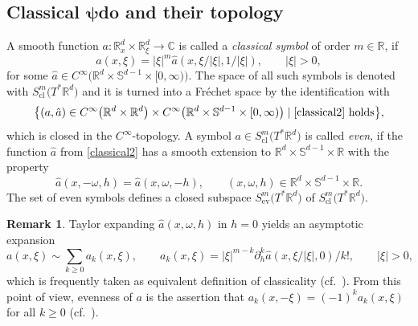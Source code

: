 \documentclass[10pt,a4paper]{amsart}
\numberwithin{equation}{section}
\theoremstyle{definition}
\newtheorem{Remark}[Theorem]{Remark}
\newcommand{\R}{\mathbb{R}} %
\newcommand{\C}{\mathbb{C}} %
\newcommand{\ev}{\mathrm{ev}}
\newcommand{\1}{{\bf 1}}
\newcommand{\cl}{\mathrm{cl}}
\begin{document}
\subsection[Classical psido and their topology]{Classical $\boldsymbol{\psi}$do and their topology}
A smooth function $a\colon \R^d_x\times \R^d_\xi\rightarrow \C$ is called a {\it classical symbol} of order $m\in \R$, if
\begin{equation}\label{classical2}
	a(x,\xi)=|\xi|^m \hat a(x,\xi/|\xi|,1/|\xi|),\qquad |\xi|>0,
\end{equation}
for some $\hat a \in C^\infty\bigl(\R^d\times \mathbb S^{d-1}\times [0,\infty)\bigr)$. The space of all such symbols is denoted with $S_\cl^m\bigl(T^*\R^d\bigr)$ and it is turned into a Fr{\'e}chet space by the identification with
\[
	\big\{(a,\hat a)\in C^\infty\bigl(\R^d\times \R^d\bigr)\times C^\infty\bigl(\R^d\times \mathbb S^{d-1}\times [0,\infty)\bigr)\mid \text{\eqref{classical2} holds}\big\},
\]
which is closed in the $C^\infty$-topology. A symbol $a\in S^m_\cl\bigl(T^*\R^d\bigr)$ is called {\it even}, if the function $\hat a$ from \eqref{classical2} has a smooth extension to $\R^d\times \mathbb S^{d-1}\times \R$ with the property
\[
	\hat a(x,-\omega,h)= \hat a(x,\omega,-h),\qquad (x,\omega,h)\in \R^d\times \mathbb S^{d-1}\times \R.
\]
The set of even symbols defines a closed subspace $S^m_\ev\bigl(T^*\R^d\bigr)$ of $S^m_\cl\bigl(T^*\R^d\bigr)$.

\begin{Remark} Taylor expanding $\hat a(x,\omega,h)$ in $h=0$ yields an asymptotic expansion
\[
	a(x,\xi) \sim \sum_{k\ge 0} a_k(x,\xi),\qquad a_k(x,\xi)=|\xi|^{m-k} \partial_h^k\hat a(x,\xi/|\xi|,0)/k!,\qquad |\xi|>0,
\]
which is frequently taken as equivalent definition of classicality (cf.\ \cite{Shu01,Wun13}). From this point of view, evenness of $a$ is the assertion that $a_k(x,-\xi)=(-1)^{k} a_k(x,\xi)$ for all $k\ge 0$ (cf.~\cite[Definition 4.6]{MNP19a}).
\end{Remark}
\end{document}
